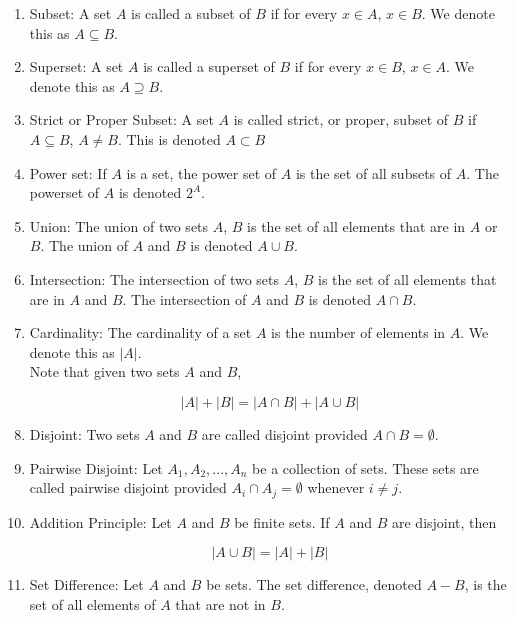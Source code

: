 \documentclass{article}
\begin{document}
\begin{enumerate}
    \item Subset: A set $A$ is called a subset of $B$ if for every $x\in A$, $x\in B$. We denote this as $A\subseteq B$. 
    
    \item Superset: A set $A$ is called a superset of $B$ if for every $x\in B$, $x\in A$. We denote this as $A\supseteq B$.
    
    \item Strict or Proper Subset: A set $A$ is called strict, or proper, subset of $B$ if $A \subseteq B$, $A\neq B$. This is denoted $A\subset B$ 
    
    \item Power set: If $A$ is a set, the power set of $A$ is the set of all subsets of $A$. The powerset of $A$ is denoted $2^A$.
    
    \item Union: The union of two sets $A$, $B$ is the set of all elements that are in $A$ or $B$. The union of $A$ and $B$ is denoted $A\cup B$.
    
    \item Intersection: The intersection of two sets $A$, $B$ is the set of all elements that are in $A$ and $B$. The intersection of $A$ and $B$ is denoted $A\cap B$.
    
    \item Cardinality: The cardinality of a set $A$ is the number of elements in $A$. We denote this as $|A|$.\\
    
    Note that given two sets $A$ and $B$, 
    
    $$|A|+|B|=|A\cap B|+|A\cup B|$$
    
    \item Disjoint: Two sets $A$ and $B$ are called disjoint provided $A\cap B=\emptyset$.
    
    \item Pairwise Disjoint: Let $A_1,A_2,...,A_n$ be a collection of sets. These sets are called pairwise disjoint provided $A_i\cap A_j=\emptyset$ whenever $i\neq j$.
    
    \item Addition Principle: Let $A$ and $B$ be finite sets. If $A$ and $B$ are disjoint, then 
    
    $$|A\cup B|=|A|+|B|$$
    
    \item Set Difference: Let $A$ and $B$ be sets. The set difference, denoted $A-B$, is the set of all elements of $A$ that are not in $B$.
    

\end{enumerate}
\end{document}
